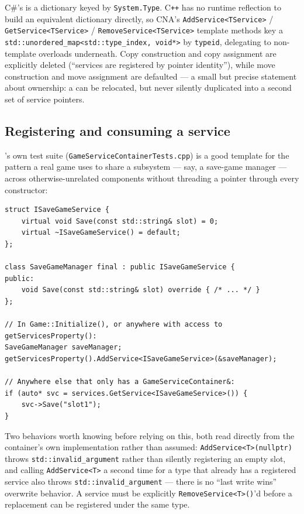 C\#'s  is a dictionary keyed by \texttt{System.Type}. C\texttt{++}
has no runtime reflection to build an equivalent dictionary directly, so CNA's
\texttt{AddService<TService>} / \texttt{GetService<TService>} / \texttt{RemoveService<TService>}
template methods key a
\texttt{std::unordered\_map<\allowbreak{}std::type\_index,\allowbreak{} void*>} by
\texttt{typeid}, delegating to non-template overloads underneath. Copy construction and copy
assignment are explicitly deleted (``services are registered by pointer identity''), while
move construction and move assignment are defaulted --- a small but precise statement about
ownership: a  can be relocated, but never silently duplicated
into a second set of service pointers.

\subsection{Registering and consuming a service}

's own test suite
(\texttt{GameServiceContainerTests.cpp}) is a good template for the pattern a real game uses
to share a subsystem --- say, a save-game manager --- across otherwise-unrelated components
without threading a pointer through every constructor:

\begin{lstlisting}
struct ISaveGameService {
    virtual void Save(const std::string& slot) = 0;
    virtual ~ISaveGameService() = default;
};

class SaveGameManager final : public ISaveGameService {
public:
    void Save(const std::string& slot) override { /* ... */ }
};

// In Game::Initialize(), or anywhere with access to getServicesProperty():
SaveGameManager saveManager;
getServicesProperty().AddService<ISaveGameService>(&saveManager);

// Anywhere else that only has a GameServiceContainer&:
if (auto* svc = services.GetService<ISaveGameService>()) {
    svc->Save("slot1");
}
\end{lstlisting}

Two behaviors worth knowing before relying on this, both read directly from the container's
own implementation rather than assumed: \texttt{AddService<T>(nullptr)} throws
\texttt{std::invalid\_argument} rather than silently registering an empty slot, and calling
\texttt{AddService<T>} a second time for a type that already has a registered service also
throws \texttt{std::invalid\_argument} --- there is no ``last write wins'' overwrite behavior.
A service must be explicitly \texttt{RemoveService<T>()}'d before a replacement can be
registered under the same type.

